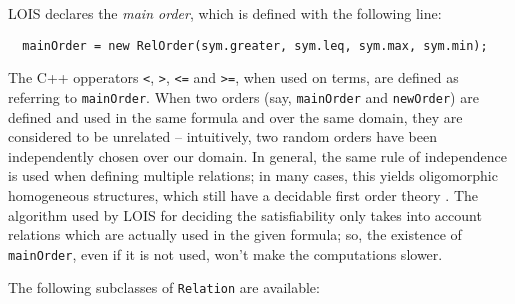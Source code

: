 LOIS declares the \emph{main order}, which is defined with the following line:

\begin{lstlisting}
  mainOrder = new RelOrder(sym.greater, sym.leq, sym.max, sym.min);
\end{lstlisting}

The C++ opperators {\tt <}, {\tt >}, {\tt <=} and {\tt >=}, when used on terms,
are defined as referring
to {\tt mainOrder}. When two orders (say, {\tt mainOrder} and {\tt newOrder}) are
defined and used in the same formula and over the same domain, they are 
considered to be unrelated -- intuitively, two random orders have been independently
chosen over our domain. In general, the same rule of independence is used when
defining multiple relations; in many cases, this yields oligomorphic homogeneous structures,
which still have a decidable first order theory \cite{lois-sat}. The algorithm used by
LOIS for deciding the satisfiability only takes into account relations which are actually
used in the given formula; so, the existence of {\tt mainOrder}, even if it is not used,
won't make the computations slower.

The following subclasses of {\tt Relation} are available:

